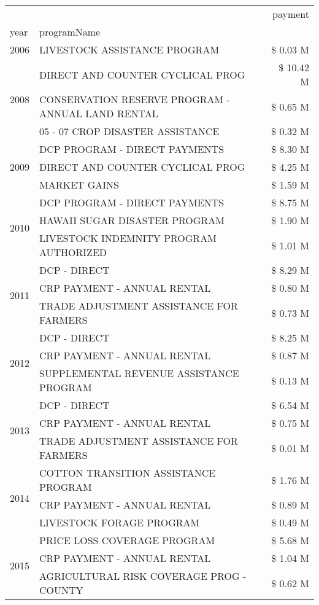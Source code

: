 \begin{tabular}{llr}
\toprule
 &  & payment \\
year & programName &  \\
\midrule
2006 & LIVESTOCK ASSISTANCE PROGRAM & \$ 0.03 M \\
\cline{1-3}
\multirow[t]{3}{*}{2008} & DIRECT AND COUNTER CYCLICAL PROG & \$ 10.42 M \\
 & CONSERVATION RESERVE PROGRAM - ANNUAL LAND RENTAL & \$ 0.65 M \\
 & 05 - 07 CROP DISASTER ASSISTANCE & \$ 0.32 M \\
\cline{1-3}
\multirow[t]{3}{*}{2009} & DCP PROGRAM - DIRECT PAYMENTS & \$ 8.30 M \\
 & DIRECT AND COUNTER CYCLICAL PROG & \$ 4.25 M \\
 & MARKET GAINS & \$ 1.59 M \\
\cline{1-3}
\multirow[t]{3}{*}{2010} & DCP PROGRAM - DIRECT PAYMENTS & \$ 8.75 M \\
 & HAWAII SUGAR DISASTER PROGRAM & \$ 1.90 M \\
 & LIVESTOCK INDEMNITY PROGRAM AUTHORIZED & \$ 1.01 M \\
\cline{1-3}
\multirow[t]{3}{*}{2011} & DCP - DIRECT & \$ 8.29 M \\
 & CRP PAYMENT - ANNUAL RENTAL & \$ 0.80 M \\
 & TRADE ADJUSTMENT ASSISTANCE FOR FARMERS & \$ 0.73 M \\
\cline{1-3}
\multirow[t]{3}{*}{2012} & DCP - DIRECT & \$ 8.25 M \\
 & CRP PAYMENT - ANNUAL RENTAL & \$ 0.87 M \\
 & SUPPLEMENTAL REVENUE ASSISTANCE PROGRAM & \$ 0.13 M \\
\cline{1-3}
\multirow[t]{3}{*}{2013} & DCP - DIRECT & \$ 6.54 M \\
 & CRP PAYMENT - ANNUAL RENTAL & \$ 0.75 M \\
 & TRADE ADJUSTMENT ASSISTANCE FOR FARMERS & \$ 0.01 M \\
\cline{1-3}
\multirow[t]{3}{*}{2014} & COTTON TRANSITION ASSISTANCE PROGRAM & \$ 1.76 M \\
 & CRP PAYMENT - ANNUAL RENTAL & \$ 0.89 M \\
 & LIVESTOCK FORAGE PROGRAM & \$ 0.49 M \\
\cline{1-3}
\multirow[t]{3}{*}{2015} & PRICE LOSS COVERAGE PROGRAM & \$ 5.68 M \\
 & CRP PAYMENT - ANNUAL RENTAL & \$ 1.04 M \\
 & AGRICULTURAL RISK COVERAGE PROG - COUNTY & \$ 0.62 M \\

\end{tabular}
